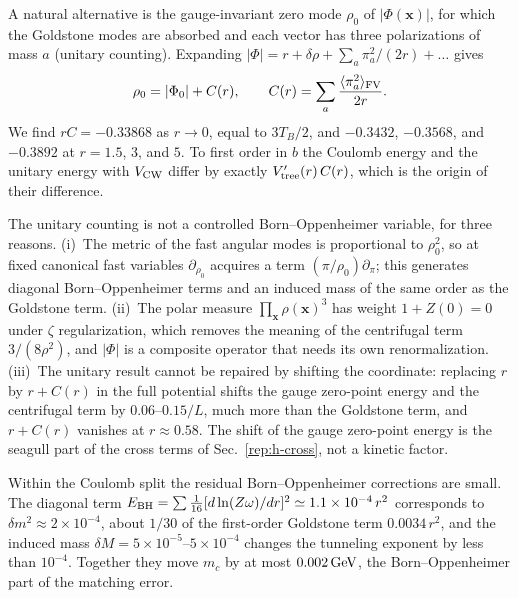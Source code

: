 A natural alternative is the gauge-invariant zero mode $\rho_0$ of $|\Phi(\bm x)|$, for which the Goldstone modes are absorbed and each vector has three polarizations of mass $a$ (unitary counting).
Expanding $|\Phi|=r+\delta\rho+\sum_a\pi_a^2/(2r)+\dots$ gives
\begin{equation}
\rho_0=|\Phi_0|+C(r),\qquad C(r)=\sum_a\frac{\langle\pi_a^2\rangle_{\rm FV}}{2r}.
\label{eq:rb-rho0}
\end{equation}
We find $rC=-0.33868$ as $r\to0$, equal to $3T_B/2$, and $-0.3432$, $-0.3568$, and $-0.3892$ at $r=1.5$, $3$, and $5$. %
To first order in $b$ the Coulomb energy and the unitary energy with $V_{\rm CW}$ differ by exactly $V'_{\rm tree}(r)\,C(r)$, which is the origin of their difference.

The unitary counting is not a controlled Born--Oppenheimer variable, for three reasons.
(i)~The metric of the fast angular modes is proportional to $\rho_0^2$, so at fixed canonical fast variables $\partial_{\rho_0}$ acquires a term $(\pi/\rho_0)\partial_\pi$; this generates diagonal Born--Oppenheimer terms and an induced mass of the same order as the Goldstone term.
(ii)~The polar measure $\prod_{\bm x}\rho(\bm x)^3$ has weight $1+Z(0)=0$ under $\zeta$ regularization, which removes the meaning of the centrifugal term $3/(8\rho^2)$, and $|\Phi|$ is a composite operator that needs its own renormalization.
(iii)~The unitary result cannot be repaired by shifting the coordinate: replacing $r$ by $r+C(r)$ in the full potential shifts the gauge zero-point energy and the centrifugal term by $0.06$--$0.15/L$, much more than the Goldstone term, and $r+C(r)$ vanishes at $r\approx0.58$. %
The shift of the gauge zero-point energy is the seagull part of the cross terms of Sec.~\ref{rep:h-cross}, not a kinetic factor.

Within the Coulomb split the residual Born--Oppenheimer corrections are small.
The diagonal term $E_{\rm BH}=\sum\frac1{16}[d\ln(Z\omega)/dr]^2\simeq1.1\times10^{-4}\,r^2$ corresponds to $\delta m^2\approx2\times10^{-4}$, about $1/30$ of the first-order Goldstone term $0.0034\,r^2$, and the induced mass $\delta M=5\times10^{-5}$--$5\times10^{-4}$ changes the tunneling exponent by less than $10^{-4}$. %
Together they move $m_c$ by at most $0.002\,\mathrm{GeV}$, the Born--Oppenheimer part of the matching error. %

